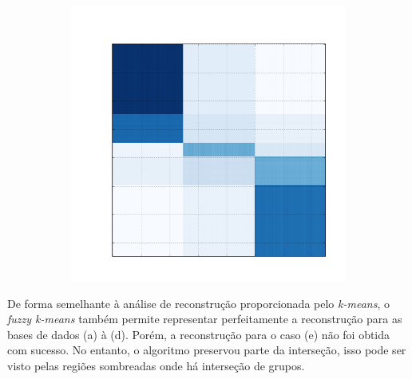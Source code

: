 \documentclass[
    12pt,                %
    oneside,            %
    a4paper,            %
    english,            %
    brazil                %
    ]{abntex2ppgsi}
\begin{document}
\begin{figure}[H]
\begin{subfigure}[b]{0.18\textwidth}
        \caption{}
    \end{subfigure}
    \begin{subfigure}[b]{0.18\textwidth}
        \includegraphics[width=\textwidth]{img/e-reconstruction-fkmeans.png}
        \caption{}
    \end{subfigure}
    \label{fig:reconstruction:fkmeans}
        \label{fig:reconstruction:kmeans}
\end{figure}



De forma semelhante à análise de reconstrução proporcionada pelo \textit{k-means}, o \textit{fuzzy k-means} também permite representar perfeitamente a reconstrução para as bases de dados (a) à (d).
Porém, a reconstrução para o caso (e) não foi obtida com sucesso.
No entanto, o algoritmo preservou parte da interseção, isso pode ser visto pelas regiões sombreadas onde há interseção de grupos.
\end{document}
